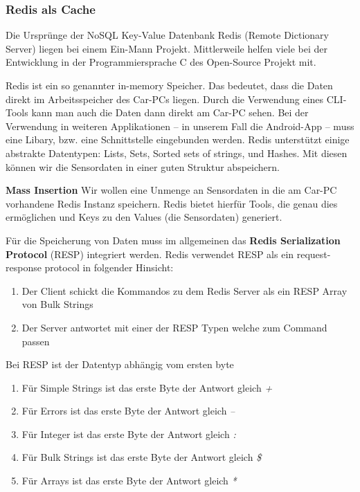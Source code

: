 \subsubsection{Redis als Cache}

Die Ursprünge der NoSQL Key-Value Datenbank Redis (Remote Dictionary Server) liegen bei einem Ein-Mann Projekt. Mittlerweile helfen viele bei der Entwicklung in der Programmiersprache C des Open-Source Projekt mit. 

Redis ist ein so genannter in-memory Speicher. Das bedeutet, dass die Daten direkt im Arbeitsspeicher des Car-PCs liegen. Durch die Verwendung eines CLI-Tools kann man auch die Daten dann direkt am Car-PC sehen. Bei der Verwendung in weiteren Applikationen – in unserem Fall die Android-App – muss eine Libary, bzw. eine Schnittstelle eingebunden werden. Redis unterstützt einige abstrakte Datentypen: Lists, Sets, Sorted sets of strings, und Hashes. Mit diesen können wir die Sensordaten in einer guten Struktur abspeichern\cite{MELD.CH3-redis.mainWebsite}.

\textbf{Mass Insertion\newline}
Wir wollen eine Unmenge an Sensordaten in die am Car-PC vorhandene Redis Instanz speichern. Redis bietet hierfür Tools, die genau dies ermöglichen und Keys zu den Values (die Sensordaten) generiert\cite{MELD.CH3-redis.documentation}.

Für die Speicherung von Daten muss im allgemeinen das \textbf{Redis Serialization Protocol} (RESP) integriert werden. Redis verwendet RESP als ein request-response protocol in folgender Hinsicht: 
\begin{enumerate}
\item Der Client schickt die Kommandos zu dem Redis Server als ein RESP Array von Bulk Strings
\item Der Server antwortet mit einer der RESP Typen welche zum Command passen
\end{enumerate}

Bei RESP ist der Datentyp abhängig vom ersten byte
\begin{enumerate}
\item Für Simple Strings ist das erste Byte der Antwort gleich \textit{+}
\item Für Errors ist das erste Byte der Antwort gleich \textit{–}
\item Für Integer ist das erste Byte der Antwort gleich \textit{:}
\item Für Bulk Strings ist das erste Byte der Antwort gleich \textit{\$}
\item Für Arrays ist das erste Byte der Antwort gleich \textit{*}
\end{enumerate}

